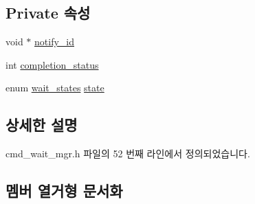 \subsection*{Private 속성}
\begin{DoxyCompactItemize}
\item 
void $\ast$ \hyperlink{classavdecc__lib_1_1cmd__wait__mgr_a9efd95348f0400f75d7eec75e3c49b5a}{notify\+\_\+id}
\item 
int \hyperlink{classavdecc__lib_1_1cmd__wait__mgr_a2928351b80e6b68ded90f7b6de6843b9}{completion\+\_\+status}
\item 
enum \hyperlink{classavdecc__lib_1_1cmd__wait__mgr_a6d8ed97126bdf056391a14a921f643a8}{wait\+\_\+states} \hyperlink{classavdecc__lib_1_1cmd__wait__mgr_a95d6840dec33a00d29915754985b0e94}{state}
\end{DoxyCompactItemize}


\subsection{상세한 설명}


cmd\+\_\+wait\+\_\+mgr.\+h 파일의 52 번째 라인에서 정의되었습니다.



\subsection{멤버 열거형 문서화}
